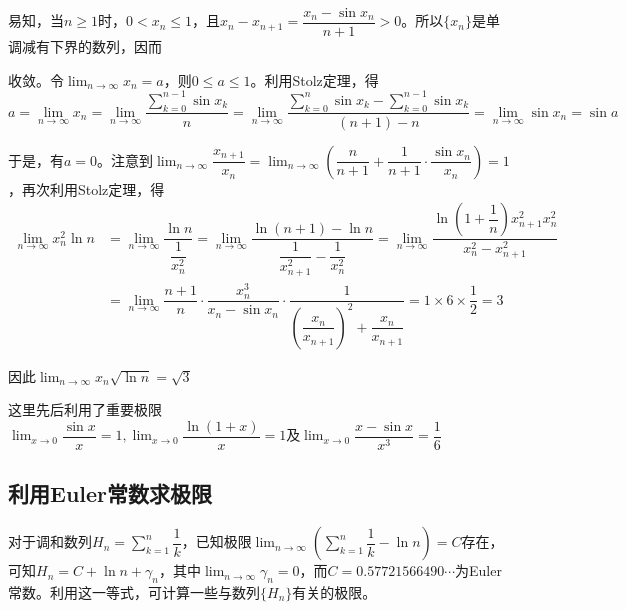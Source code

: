 \begin{solution}
    易知，当$n\geq1$时，$0<x_n\leq1$，且$x_n-x_{n+1}=\dfrac{x_n-\sin x_n}{n+1}>0$。所以$\{x_n\}$是单调减有下界的数列，因而
    \vspace{1mm}
    
    收敛。令$\displaystyle\lim_{n\rightarrow\infty}x_n=a$，则$0\leq a\leq1$。利用Stolz定理，得
    \begin{equation}
        a=\lim_{n\rightarrow\infty}x_n=\lim_{n\rightarrow\infty}\dfrac{\displaystyle\sum_{k=0}^{n-1}\sin x_k}{n}=\lim_{n\rightarrow\infty}\dfrac{\displaystyle\sum_{k=0}^n \sin x_k - \sum_{k=0}^{n-1}\sin x_k}{(n+1)-n}=\lim_{n\rightarrow\infty}\sin x_n=\sin a
        \nonumber
    \end{equation}

    于是，有$a=0$。注意到$\displaystyle\lim_{n\rightarrow\infty}\dfrac{x_{n+1}}{x_n}=\lim_{n\rightarrow\infty} \left( \dfrac{n}{n+1}+\dfrac{1}{n+1}\cdot\dfrac{\sin x_n}{x_n} \right) =1$，再次利用Stolz定理，得
    \begin{equation}
    \begin{aligned}
        \lim_{n\rightarrow\infty}x_n^2\ln n &= \lim_{n\rightarrow\infty}\dfrac{\ln n}{\dfrac{1}{x_n^2}}=\lim_{n\rightarrow\infty}\dfrac{\ln(n+1)-\ln n}{\dfrac{1}{x_{n+1}^2}-\dfrac{1}{x_n^2}}=\lim_{n\rightarrow\infty}\dfrac{\ln(1+\dfrac{1}{n})x_{n+1}^2 x_n^2}{x_n^2-x_{n+1}^2} \\
        &= \lim_{n\rightarrow\infty}\dfrac{n+1}{n}\cdot\dfrac{x_n^3}{x_n-\sin x_n}\cdot\dfrac{1}{\left( \dfrac{x_n}{x_{n+1}} \right)^2+\dfrac{x_n}{x_{n+1}}}=1\times6\times\dfrac{1}{2}=3
    \end{aligned}
        \nonumber
    \end{equation}

    因此$\displaystyle\lim_{n\rightarrow\infty}x_n\sqrt{\ln n}=\sqrt{3}$
\end{solution}

\begin{note}
    这里先后利用了重要极限$\displaystyle\lim_{x\rightarrow0}\dfrac{\sin x}{x}=1,\lim_{x\rightarrow0}\dfrac{\ln(1+x)}{x}=1\mbox{及}\lim_{x\rightarrow0}\dfrac{x-\sin x}{x^3}=\dfrac{1}{6}$
\end{note}

\subsection{利用Euler常数求极限}
对于调和数列$H_n=\displaystyle\sum_{k=1}^n \dfrac{1}{k}$，已知极限$\displaystyle\lim_{n\rightarrow\infty}\left(\sum_{k=1}^n\dfrac{1}{k}-\ln n\right)=C$存在，可知$H_n=C+\ln n+\gamma_n$，其中$\displaystyle\lim_{n\rightarrow\infty}\gamma_n=0$，而$C=0.57721566490\cdots$为Euler常数。利用这一等式，可计算一些与数列$\{H_n\}$有关的极限。


